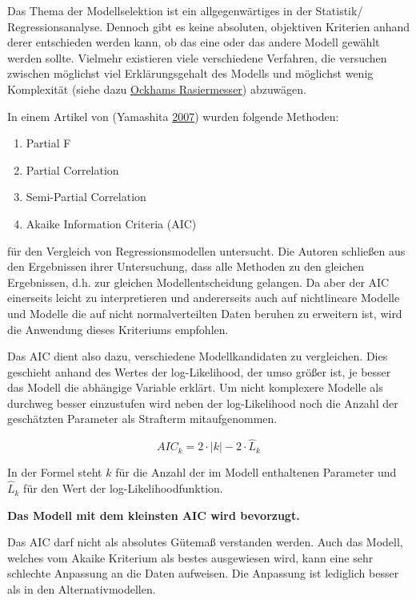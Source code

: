 \documentclass[]{article}
\providecommand{\tightlist}{%
  \setlength{\itemsep}{0pt}\setlength{\parskip}{0pt}}
\begin{document}
Das Thema der Modellselektion ist ein allgegenwärtiges in der Statistik/
Regressionsanalyse. Dennoch gibt es keine absoluten, objektiven
Kriterien anhand derer entschieden werden kann, ob das eine oder das
andere Modell gewählt werden sollte. Vielmehr existieren viele
verschiedene Verfahren, die versuchen zwischen möglichst viel
Erklärungsgehalt des Modells und möglichst wenig Komplexität (siehe dazu
\href{https://de.wikipedia.org/wiki/Ockhams_Rasiermesser}{Ockhams
Rasiermesser}) abzuwägen.

In einem Artikel von (Yamashita \protect\hyperlink{ref-Yamashita}{2007})
wurden folgende Methoden:

\begin{enumerate}
\def\labelenumi{\alph{enumi}.}
\tightlist
\item
  Partial F
\item
  Partial Correlation
\item
  Semi-Partial Correlation
\item
  Akaike Information Criteria (AIC)
\end{enumerate}

für den Vergleich von Regressionsmodellen untersucht. Die Autoren
schließen aus den Ergebnissen ihrer Untersuchung, dass alle Methoden zu
den gleichen Ergebnissen, d.h. zur gleichen Modellentscheidung gelangen.
Da aber der AIC einerseits leicht zu interpretieren und andererseits
auch auf nichtlineare Modelle und Modelle die auf nicht normalverteilten
Daten beruhen zu erweitern ist, wird die Anwendung dieses Kriteriums
empfohlen.

Das AIC dient also dazu, verschiedene Modellkandidaten zu vergleichen.
Dies geschieht anhand des Wertes der log-Likelihood, der umso größer
ist, je besser das Modell die abhängige Variable erklärt. Um nicht
komplexere Modelle als durchweg besser einzustufen wird neben der
log-Likelihood noch die Anzahl der geschätzten Parameter als Strafterm
mitaufgenommen.

\begin{equation} 
  AIC_k = 2 \cdot |k| - 2\cdot \hat{L}_k
  \label{eq:AIC}
\end{equation}

In der Formel steht \(k\) für die Anzahl der im Modell enthaltenen
Parameter und \(\hat{L}_k\) für den Wert der log-Likelihoodfunktion.

\textbf{Das Modell mit dem kleinsten AIC wird bevorzugt.}

Das AIC darf nicht als absolutes Gütemaß verstanden werden. Auch das
Modell, welches vom Akaike Kriterium als bestes ausgewiesen wird, kann
eine sehr schlechte Anpassung an die Daten aufweisen. Die Anpassung ist
lediglich besser als in den Alternativmodellen.
\end{document}
